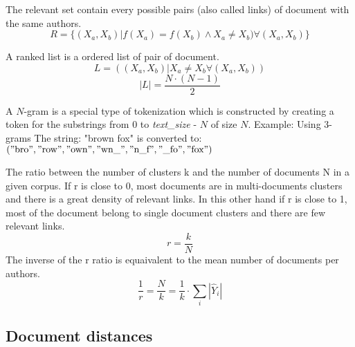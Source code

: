 \begin{definition}
  The relevant set contain every possible pairs (also called links) of document with the same authors.
  \begin{equation}
    R = \{(X_a, X_b) | f(X_a) = f(X_b) \land X_a \neq X_b) \forall (X_a, X_b)\}
  \end{equation}
\end{definition}

\begin{definition}
  A ranked list is a ordered list of pair of document.
  \begin{equation}
    L = ((X_a, X_b) | X_a \neq X_b \forall (X_a, X_b))
  \end{equation}
  \begin{equation}
    |L| = \frac{N \cdot (N - 1)}{2}
  \end{equation}
\end{definition}

\begin{definition}[$N$-Grams]
  A $N$-gram is a special type of tokenization which is constructed by creating a token for the substrings from $0$ to \textit{text\_size} - $N$ of size $N$.
  Example: Using 3-grams The string: "brown fox" is converted to: \\
  $("\text{bro}", "\text{row}", "\text{own}", "\text{wn\_}", "\text{n\_f}", "\text{\_fo}", "\text{fox}")$
\end{definition}

\begin{definition}
  The ratio between the number of clusters k and the number of documents N in a given corpus.
  If r is close to 0, most documents are in multi-documents clusters and there is a great density of relevant links.
  In this other hand if r is close to 1, most of the document belong to single document clusters and there are few relevant links.
  \begin{equation}
    r = \frac{k}{N}
  \end{equation}
  The inverse of the r ratio is equaivalent to the mean number of documents per authors.
  \begin{equation}
    \frac{1}{r} = \frac{N}{k} = \frac{1}{k} \cdot \sum_{i} |\hat{Y}_i|
  \end{equation}
\end{definition}

\subsection{Document distances}

